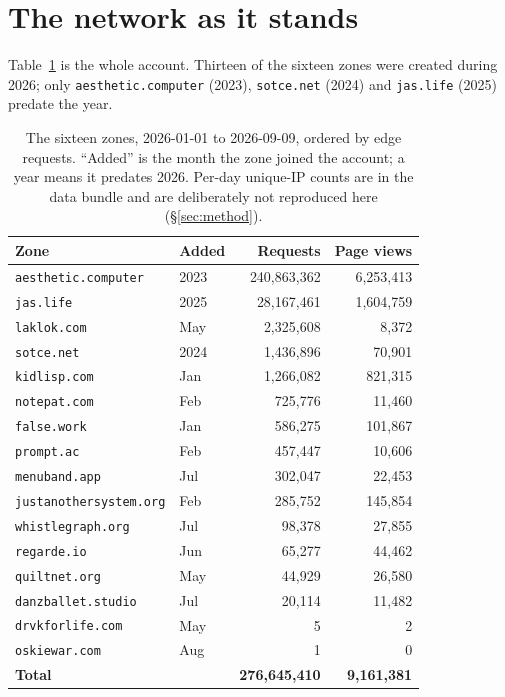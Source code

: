 \documentclass[10pt,letterpaper,twocolumn]{article}
\begin{document}
\section{The network as it stands}
\label{sec:network}

Table~\ref{tab:zones} is the whole account. Thirteen of the sixteen
zones were created during 2026; only \texttt{aesthetic.computer} (2023),
\texttt{sotce.net} (2024) and \texttt{jas.life} (2025) predate the year.

\begin{table}[t]
\centering
\footnotesize
\caption{The sixteen zones, 2026-01-01 to 2026-09-09, ordered by edge requests. ``Added'' is the month the zone joined the account; a year means it predates 2026. Per-day unique-IP counts are in the data bundle and are deliberately not reproduced here (\S\ref{sec:method}).}
\label{tab:zones}
\scriptsize
\begin{tabular}{@{}l l r r@{}}
\toprule
\textbf{Zone} & \textbf{Added} & \textbf{Requests} & \textbf{Page views} \\
\midrule
\texttt{aesthetic.computer} & 2023 & 240,863,362 & 6,253,413 \\
\texttt{jas.life} & 2025 & 28,167,461 & 1,604,759 \\
\texttt{laklok.com} & May & 2,325,608 & 8,372 \\
\texttt{sotce.net} & 2024 & 1,436,896 & 70,901 \\
\texttt{kidlisp.com} & Jan & 1,266,082 & 821,315 \\
\texttt{notepat.com} & Feb & 725,776 & 11,460 \\
\texttt{false.work} & Jan & 586,275 & 101,867 \\
\texttt{prompt.ac} & Feb & 457,447 & 10,606 \\
\texttt{menuband.app} & Jul & 302,047 & 22,453 \\
\texttt{justanothersystem.org} & Feb & 285,752 & 145,854 \\
\texttt{whistlegraph.org} & Jul & 98,378 & 27,855 \\
\texttt{regarde.io} & Jun & 65,277 & 44,462 \\
\texttt{quiltnet.org} & May & 44,929 & 26,580 \\
\texttt{danzballet.studio} & Jul & 20,114 & 11,482 \\
\texttt{drvkforlife.com} & May & 5 & 2 \\
\texttt{oskiewar.com} & Aug & 1 & 0 \\
\midrule
\textbf{Total} & & \textbf{276,645,410} & \textbf{9,161,381} \\
\bottomrule
\end{tabular}
\end{table}
\end{document}

